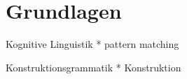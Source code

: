 \section{Grundlagen}

Kognitive Linguistik
* pattern matching

Konstruktionsgrammatik
* Konstruktion
